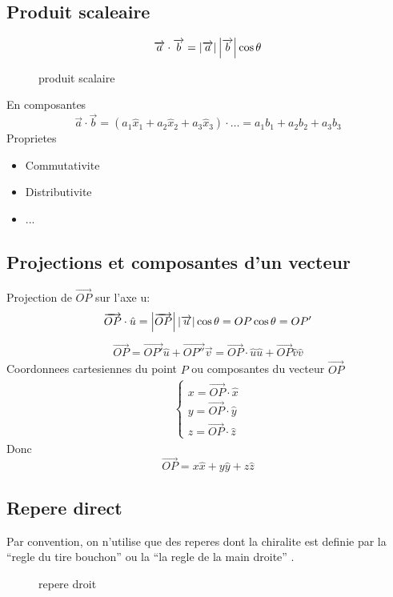 \documentclass[../main.tex]{subfiles}
\begin{document}
\subsection{Produit scaleaire}
\begin{defn}\label{defn:produit_scalaire}
	\begin{align*}
		\overrightarrow{a} \cdot \overrightarrow{b} &= \left\vert\overrightarrow{a}\right\vert \left\vert\overrightarrow{b}\right\vert \cos \theta\\
	\end{align*}
\begin{figure}[ht]
    \centering
    \caption{produit scalaire}
    \label{fig:produit-scalaire}
\end{figure}
	
En composantes
\[ 
	\vec{a} \cdot \vec{b} = ( a_1 \hat{x}_1 + a_2 \hat{x}_2 + a_3 \hat{x}_3) \cdot \ldots = a_1b_1 + a_2b_2 +a_3 b_3
\]
Proprietes
\begin{itemize}
\item Commutativite
\item Distributivite
\item ...
\end{itemize}


\end{defn}



\subsection{Projections et composantes d'un vecteur}
Projection de $\vec{OP}$ sur l'axe u:
\[ 
	\overrightarrow{OP} \cdot \hat{u} = \left\vert\overrightarrow{OP}\right\vert \left\vert\overrightarrow{u}\right\vert \cos \theta = OP \cos \theta = OP'
\]
\begin{align*}
\vec{OP} = \vec{OP'} \hat{u} + \vec{OP''} \vec{v} = \vec{OP}\cdot \hat{u} \hat{u} + \vec{OP} \hat{v} \hat{v}
\end{align*}
Coordonnees cartesiennes du point $P$ ou composantes du vecteur $\vec{OP}$
\begin{align*}
\begin{cases}
x = \vec{OP} \cdot \hat{x}\\
y = \vec{OP} \cdot \hat{y}\\
z = \vec{OP} \cdot \hat{z}
\end{cases}
\end{align*}
Donc
\[ 
\vec{OP} = x \hat{x} + y \hat{y} + z \hat{z}
\]
\subsection{Repere direct}
Par convention, on n'utilise que des reperes dont la chiralite est definie par la ``regle du tire bouchon'' ou la ``la regle de la main droite'' .\\
\begin{figure}[H]
    \centering
    \caption{repere droit}
    \label{fig:repere-droit}
\end{figure}
\end{document}
